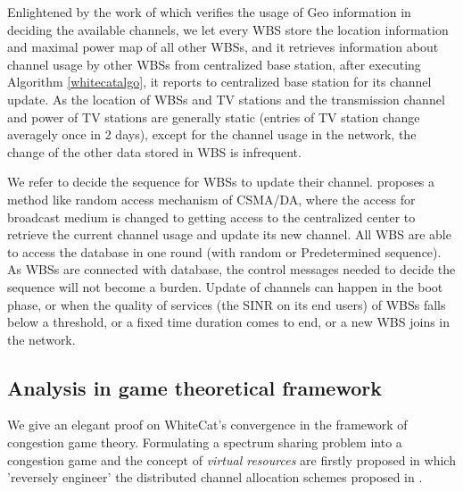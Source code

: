 Enlightened by the work of \cite{SenseLess2011} which verifies the usage of Geo information in deciding the available channels, we let every WBS store the location information and maximal power map of all other WBSs, and it retrieves information about channel usage by other WBSs from centralized base station, after executing Algorithm \ref{whitecatalgo}, it reports to centralized base station for its channel update. As the location of WBSs and TV stations and the transmission channel and power of TV stations are generally static (entries of TV station change averagely once in 2 days\cite{SenseLess2011}), except for the channel usage in the network, the change of the other data stored in WBS is infrequent. 


We refer \cite{CApotentialLearning_05dyspan} to decide the sequence for WBSs to update their channel. \cite{CApotentialLearning_05dyspan} proposes a method like random access mechanism of CSMA/DA, where the access for broadcast medium is changed to getting access to the centralized center to retrieve the current channel usage and update its new channel. All WBS are able to access the database in one round (with random or Predetermined sequence). As WBSs are connected with database, the control messages needed to decide the sequence will not become a burden. Update of channels can happen in the boot phase, or when the quality of services (the SINR on its end users) of WBSs falls below a threshold, or a fixed time duration comes to end, or a new WBS joins in the network. 


\subsection{Analysis in game theoretical framework}
\label{game}
We give an elegant proof on WhiteCat's convergence in the framework of congestion game theory. Formulating a spectrum sharing problem into a congestion game and the concept of \textit{virtual resources} are firstly proposed in \cite{allerton08_liu} which 'reversely engineer' the distributed channel allocation schemes proposed in \cite{Babadi08, Ko_DistributedCA}.

